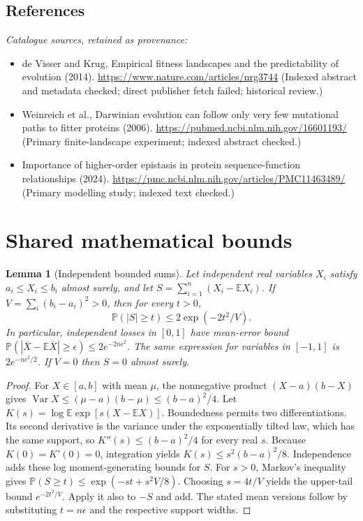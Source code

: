 \documentclass[11pt]{article}
\newcommand{\E}{\mathbb E}
\newcommand{\Prob}{\mathbb P}
\DeclareMathOperator{\Var}{Var}
\providecommand{\E}{\mathbb E}
\providecommand{\Prob}{\mathbb P}
\providecommand{\Var}{\operatorname{Var}}
\newtheorem{sharedlemma}{Lemma}[section]
\begin{document}
\subsection{References}
\noindent\emph{Catalogue sources, retained as provenance:}
\begin{itemize}
\item de Visser and Krug, Empirical fitness landscapes and the predictability of evolution (2014). \url{https://www.nature.com/articles/nrg3744} (Indexed abstract and metadata checked; direct publisher fetch failed; historical review.)
\item Weinreich et al., Darwinian evolution can follow only very few mutational paths to fitter proteins (2006). \url{https://pubmed.ncbi.nlm.nih.gov/16601193/} (Primary finite-landscape experiment; indexed abstract checked.)
\item Importance of higher-order epistasis in protein sequence-function relationships (2024). \url{https://pmc.ncbi.nlm.nih.gov/articles/PMC11463489/} (Primary modelling study; indexed text checked.)
\end{itemize}
\clearpage


\appendix
\section{Shared mathematical bounds}\label{app:bounds}
\begin{sharedlemma}[Independent bounded sums]\label{lem:bounded}
Let independent real variables $X_i$ satisfy $a_i\leq X_i\leq b_i$ almost surely,
and let $S=\sum_{i=1}^n(X_i-\E X_i)$. If
$V=\sum_i(b_i-a_i)^2>0$, then for every $t>0$,
\[
 \Prob(|S|\geq t)\leq 2\exp(-2t^2/V).
\]
In particular, independent losses in $[0,1]$ have mean-error bound
$\Prob(|\overline X-\E\overline X|\geq\epsilon)
\leq2e^{-2n\epsilon^2}$. The same expression for variables in $[-1,1]$
is $2e^{-n\epsilon^2/2}$. If $V=0$ then $S=0$ almost surely.
\end{sharedlemma}
\begin{proof}
For $X\in[a,b]$ with mean $\mu$, the nonnegative product
$(X-a)(b-X)$ gives
$\Var X\leq(\mu-a)(b-\mu)\leq(b-a)^2/4$.
Let $K(s)=\log\E\exp[s(X-\E X)]$.
Boundedness permits two differentiations. Its second derivative is the variance
under the exponentially tilted law, which has the same support, so
$K''(s)\leq(b-a)^2/4$ for every real $s$.
Because $K(0)=K'(0)=0$, integration yields
$K(s)\leq s^2(b-a)^2/8$.
Independence adds these log moment-generating bounds for $S$.
For $s>0$, Markov's inequality gives
$\Prob(S\geq t)\leq\exp(-st+s^2V/8)$.
Choosing $s=4t/V$ yields the upper-tail bound $e^{-2t^2/V}$.
Apply it also to $-S$ and add. The stated mean versions follow by substituting
$t=n\epsilon$ and the respective support widths.
\end{proof}
\end{document}
